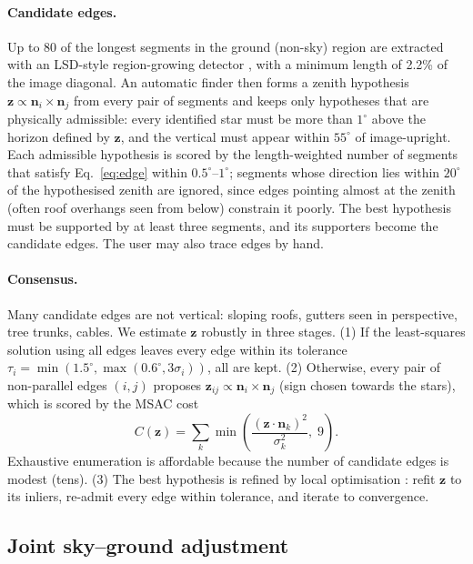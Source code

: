 \documentclass[11pt,a4paper]{article}
\newcommand{\z}{\bm{z}}
\newcommand{\n}{\bm{n}}
\begin{document}
\paragraph{Candidate edges.} Up to 80 of the longest segments in the ground (non-sky) region are extracted with an LSD-style region-growing detector \citep{vongioi2010lsd}, with a minimum length of 2.2\% of the image diagonal. An automatic finder then forms a zenith hypothesis $\z\propto\n_i\times\n_j$ from every pair of segments and keeps only hypotheses that are physically admissible: every identified star must be more than $1^\circ$ above the horizon defined by $\z$, and the vertical must appear within $55^\circ$ of image-upright. Each admissible hypothesis is scored by the length-weighted number of segments that satisfy Eq.~\eqref{eq:edge} within $0.5^\circ$--$1^\circ$; segments whose direction lies within $20^\circ$ of the hypothesised zenith are ignored, since edges pointing almost at the zenith (often roof overhangs seen from below) constrain it poorly. The best hypothesis must be supported by at least three segments, and its supporters become the candidate edges. The user may also trace edges by hand.

\paragraph{Consensus.} Many candidate edges are not vertical: sloping roofs, gutters seen in perspective, tree trunks, cables. We estimate $\z$ robustly in three stages. (1) If the least-squares solution using all edges leaves every edge within its tolerance $\tau_i = \min(1.5^\circ,\max(0.6^\circ,3\sigma_i))$, all are kept. (2) Otherwise, every pair of non-parallel edges $(i,j)$ proposes $\z_{ij} \propto \n_i\times\n_j$ (sign chosen towards the stars), which is scored by the MSAC cost \citep{torr2000mlesac}
\begin{equation}
C(\z) = \sum_k \min\!\left(\frac{(\z\cdot\n_k)^2}{\sigma_k^2},\; 9\right).
\end{equation}
Exhaustive enumeration is affordable because the number of candidate edges is modest (tens). (3) The best hypothesis is refined by local optimisation \citep{chum2003lo}: refit $\z$ to its inliers, re-admit every edge within tolerance, and iterate to convergence.

\subsection{Joint sky--ground adjustment}
\label{sec:joint}
\end{document}
